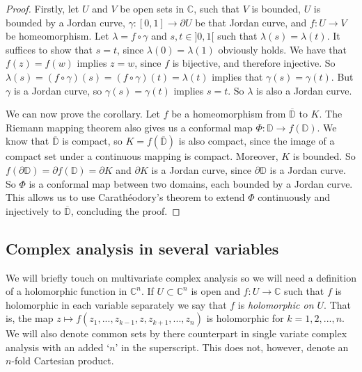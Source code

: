\documentclass[a4paper,12pt,twoside,BCOR=10mm]{scrbook}
\theoremstyle{definition}
\theoremstyle{definition}
\theoremstyle{definition}
\begin{document}
\begin{proof}

Firstly, let
	$U$ and $V$ be open sets in $\mathbb{C}$,
	such that $V$ is bounded,
	$U$ is bounded by a Jordan curve,
	$\gamma: [0, 1] \rightarrow \partial U$ be that Jordan curve,
	and $f: U \rightarrow V$ be homeomorphism.
Let $\lambda = f \circ \gamma$ and $s, t \in ]0, 1[$ such that $\lambda(s) = \lambda(t)$.
It suffices to show that $s = t$, since $\lambda(0) = \lambda(1)$ obviously holds.
We have that $f(z) = f(w)$ implies $z = w$, since $f$ is bijective, and therefore injective.
So $\lambda(s) = (f \circ \gamma)(s) = (f \circ \gamma)(t) = \lambda(t)$ implies that $\gamma(s) = \gamma(t)$.
But $\gamma$ is a Jordan curve, so $\gamma(s) = \gamma(t)$ implies $s = t$.
So $\lambda$ is also a Jordan curve. 

We can now prove the corollary.
Let $f$ be a homeomorphism from $\overline{\mathbb{D}}$ to $K$.
The Riemann mapping theorem also gives us a conformal map $\Phi: \mathbb{D} \rightarrow f(\mathbb{D})$.
We know that $\overline{\mathbb{D}}$ is compact, so $K = f(\overline{\mathbb{D}})$ is also compact, since the image of a compact set under a continuous mapping is compact.
Moreover, $K$ is bounded.
So $f(\partial \mathbb{D}) = \partial f(\mathbb{D}) = \partial K$ and $\partial K$ is a Jordan curve, since $\partial \mathbb{D}$ is a Jordan curve.
So $\Phi$ is a conformal map between two domains, each bounded by a Jordan curve.
This allows us to use Carathéodory's theorem to extend $\Phi$ continuously and injectively to $\overline{\mathbb{D}}$, concluding the proof.
\end{proof}

\subsection{Complex analysis in several variables}
\label{index9}
We will briefly touch on multivariate complex analysis so we will need a definition of a holomorphic function in $\mathbb{C}^n$.
If $U \subset \mathbb{C}^n$ is open and $f: U \rightarrow \mathbb{C}$ such that $f$ is holomorphic in each variable separately we say that $f$ is \emph{holomorphic on $U$}.
That is, the map $z \mapsto f(z_1, ..., z_{k - 1}, z, z_{k + 1}, ..., z_n)$ is holomorphic for $k = 1, 2, ..., n$.
We will also denote common sets by there counterpart in single variate complex analysis with an added `$n$' in the superscript.
This does not, however, denote an $n$-fold Cartesian product.
\end{document}
